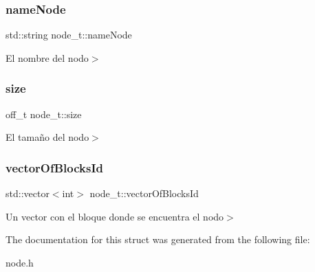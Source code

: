 \subsubsection{\texorpdfstring{name\+Node}{nameNode}}
{\footnotesize\ttfamily std\+::string node\+\_\+t\+::name\+Node}

El nombre del nodo$>$ \mbox{\label{structnode__t_a692153fd99c77b0a2a2e06571abd41f2}} 
\subsubsection{\texorpdfstring{size}{size}}
{\footnotesize\ttfamily off\+\_\+t node\+\_\+t\+::size}

El tamaño del nodo$>$ \mbox{\label{structnode__t_aabfde8107272be30b155bcff86a486de}} 
\subsubsection{\texorpdfstring{vector\+Of\+Blocks\+Id}{vectorOfBlocksId}}
{\footnotesize\ttfamily std\+::vector$<$int$>$ node\+\_\+t\+::vector\+Of\+Blocks\+Id}

Un vector con el bloque donde se encuentra el nodo$>$ 

The documentation for this struct was generated from the following file\+:\begin{DoxyCompactItemize}
\item 
node.\+h\end{DoxyCompactItemize}
